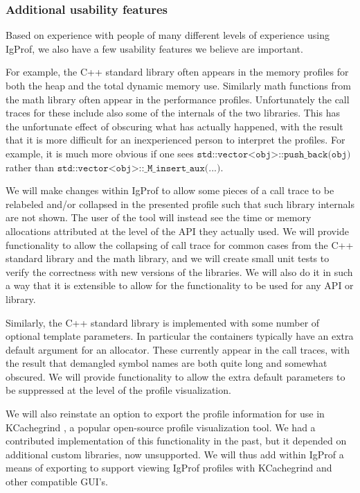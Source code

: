 \documentclass[notitlepage,letter,12pt]{article}
\begin{document}
\subsubsection{Additional usability features}

Based on experience with people of many different levels of experience
using IgProf, we also have a few usability features we believe are
important.

For example, the C++ standard library often appears in the memory
profiles for both the heap and the total dynamic memory use. Similarly
math functions from the math library often appear in the performance
profiles. Unfortunately the call traces for these include also some
of the internals of the two libraries. This has the unfortunate
effect of obscuring what has actually happened, with the result
that it is more difficult for an inexperienced person to interpret
the profiles. For example, it is much more obvious if one sees
$\texttt{std::vector<obj>::push\_back(obj)}$ rather than $\texttt{std::vector<obj>::\_M\_insert\_aux(...)}$.

We will make changes within IgProf to allow some pieces of a call 
trace to be relabeled and/or collapsed in the presented profile such that 
such library internals are not shown. The user of the tool will instead see
the time or memory allocations attributed at the level of the API they
actually used. We will provide functionality to allow the collapsing of
call trace for common cases from the C++ standard library and the math library,
and we will create small unit tests to verify the correctness with
new versions of the libraries. We will also do it in such a way that 
it is extensible to allow for the functionality to be used for any 
API or library. 

Similarly, the C++ standard library is implemented with some number
of optional template parameters. In particular the containers typically
have an extra default argument for an allocator. These currently appear
in the call traces, with the result that demangled symbol names are
both quite long and somewhat obscured. We will provide functionality
to allow the extra default parameters to be suppressed at the level
of the profile visualization.

We will also reinstate an option to export the profile information for
use in KCachegrind \cite{CACHEGRIND,KCACHEGRIND}, a popular open-source
profile visualization tool. We had a contributed implementation of this 
functionality in the past, but it depended on additional custom libraries, 
now unsupported. We will thus add within IgProf a means of exporting to
support viewing IgProf profiles with KCachegrind and other compatible GUI's.
\end{document}
